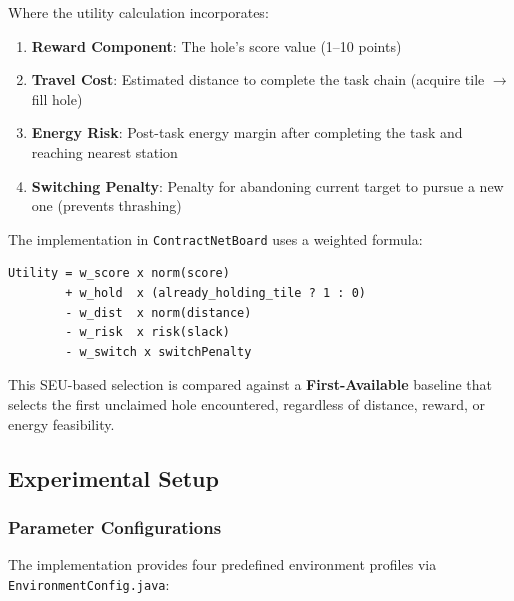 Where the utility calculation incorporates:

\begin{enumerate}
  \item \textbf{Reward Component}: The hole's score value (1--10 points)
  \item \textbf{Travel Cost}: Estimated distance to complete the task chain (acquire tile $\to$ fill hole)
  \item \textbf{Energy Risk}: Post-task energy margin after completing the task and reaching nearest station
  \item \textbf{Switching Penalty}: Penalty for abandoning current target to pursue a new one (prevents thrashing)
\end{enumerate}

The implementation in \texttt{ContractNetBoard} uses a weighted formula:

\begin{verbatim}
Utility = w_score x norm(score)
        + w_hold  x (already_holding_tile ? 1 : 0)
        - w_dist  x norm(distance)
        - w_risk  x risk(slack)
        - w_switch x switchPenalty
\end{verbatim}

This SEU-based selection is compared against a \textbf{First-Available} baseline that selects the first unclaimed hole encountered, regardless of distance, reward, or energy feasibility.

\subsection{Experimental Setup}

\subsubsection{Parameter Configurations}

The implementation provides four predefined environment profiles via \texttt{EnvironmentConfig.java}:

